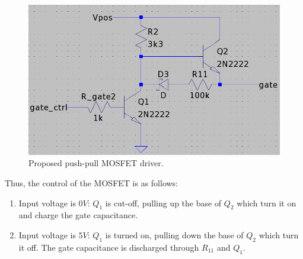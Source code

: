 \documentclass[../main.tex]{subfiles}
\begin{document}
    \begin{figure}[!h]
        \centerline{\includegraphics[width=\linewidth]{media/proposed_gate_driver.png}}
        \caption{Proposed push-pull MOSFET driver.}
        \label{fig:proposed_gate_driver}
    \end{figure}

    \justify
    Thus, the control of the MOSFET is as follows:
    \begin{enumerate}
        \item Input voltage is $0V$: $Q_1$ is cut-off, pulling up the base of $Q_2$ which turn it on and charge the gate capacitance.
        \item Input voltage is $5V$: $Q_1$ is turned on, pulling down the base of $Q_2$ which turn it off. The gate capacitance is discharged through $R_{11}$ and $Q_1$.
    \end{enumerate}
    
\end{document}
